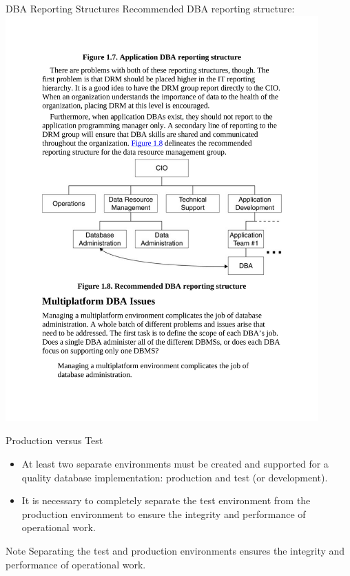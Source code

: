 \documentclass{beamer}
\begin{document}
\begin{frame}{DBA Reporting Structures}
    Recommended DBA reporting structure:\\
    \vspace{5mm}
    \centering
    \includegraphics[width=0.9\textwidth, trim={2.55cm 9.60cm 2.55cm 9.80cm}, clip]{figures/dba_reporting2}
\end{frame}

\begin{frame}{Production versus Test}
    \begin{itemize}
        \item At least two separate environments must be created and supported for a quality database implementation: production and test (or development).
        \item It is necessary to completely separate the test environment from the production environment to ensure the integrity and performance of operational work.
    \end{itemize}
    \begin{alertblock}{Note}
        Separating the test and production environments ensures the integrity and performance of operational work.
    \end{alertblock}
\end{frame}
\end{document}
